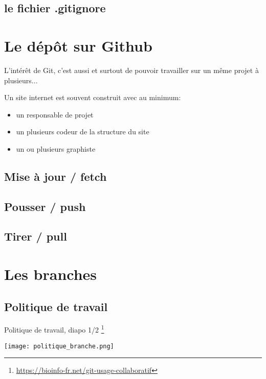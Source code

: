 \documentclass[10pt]{beamer}
\begin{document}
\subsection{le fichier .gitignore}



\section{Le dépôt sur Github}

\begin{frame}
L'intérêt de Git, c'est aussi et surtout de pouvoir travailler sur un même projet à plusieurs...

Un site internet est souvent construit avec au minimum:
\begin{itemize}
\item un responsable de projet
\item un plusieurs codeur de la structure du site
\item un ou plusieurs graphiste

\end{itemize}
\end{frame}

\subsection{Mise à jour / fetch}
\subsection{Pousser / push}
\subsection{Tirer / pull}


\section{Les branches}

\subsection{Politique de travail }

\begin{frame}{Politique de travail, diapo 1/2 \footnote{\url{https://bioinfo-fr.net/git-usage-collaboratif}}}

\begin{center}
\texttt{[image: politique\_branche.png]}
\end{center}

\end{frame}
\end{document}
